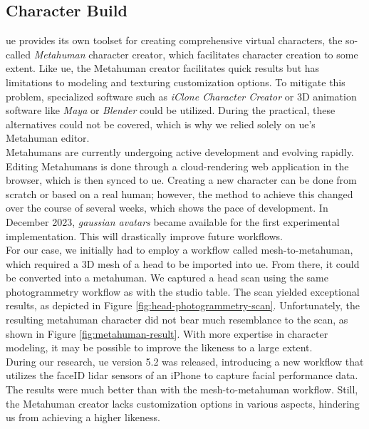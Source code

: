 \documentclass[
  a4paper,  %
  twoside,  %
  bibliography=totoc,
  headsepline,
  cleardoublepage=empty,
  parskip=half,
  draft=false
]{scrbook}
\begin{document}
\subsection*{Character Build}
\gls{ue} provides its own toolset for creating comprehensive virtual characters, the so-called \textit{Metahuman} character creator, which facilitates character creation to some extent. Like \gls{ue}, the Metahuman creator facilitates quick results but has limitations to modeling and texturing customization options. To mitigate this problem, specialized software such as \textit{iClone Character Creator} or 3D animation software like \textit{Maya} or \textit{Blender} could be utilized. During the practical, these alternatives could not be covered, which is why we relied solely on \gls{ue}'s Metahuman editor. \\
Metahumans are currently undergoing active development and evolving rapidly. Editing Metahumans is done through a cloud-rendering web application in the browser, which is then synced to \gls{ue}. Creating a new character can be done from scratch or based on a real human; however, the method to achieve this changed over the course of several weeks, which shows the pace of development. In December 2023, \textit{gaussian avatars} became available for the first experimental implementation. This will drastically improve future workflows. \\
For our case, we initially had to employ a workflow called mesh-to-metahuman, which required a 3D mesh of a head to be imported into \gls{ue}. From there, it could be converted into a metahuman. We captured a head scan using the same photogrammetry workflow as with the studio table. The scan yielded exceptional results, as depicted in Figure \ref{fig:head-photogrammetry-scan}. Unfortunately, the resulting metahuman character did not bear much resemblance to the scan, as shown in Figure \ref{fig:metahuman-result}. With more expertise in character modeling, it may be possible to improve the likeness to a large extent. \\
During our research, \gls{ue} version 5.2 was released, introducing a new workflow that utilizes the faceID lidar sensors of an iPhone to capture facial performance data. The results were much better than with the mesh-to-metahuman workflow. Still, the Metahuman creator lacks customization options in various aspects, hindering us from achieving a higher likeness.
\end{document}
